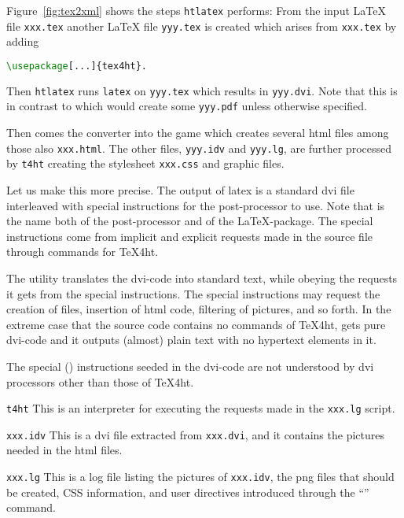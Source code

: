 Figure~\ref{fig:tex2xml} shows the steps \texttt{htlatex} performs: 
From the input \LaTeX{} file \texttt{xxx.tex} 
another \LaTeX{} file \texttt{yyy.tex} is created 
which arises from \texttt{xxx.tex} by adding 
\begin{lstlisting}[language=TeX]
\usepackage[...]{tex4ht}. 
\end{lstlisting}
%
Then \texttt{htlatex} runs \texttt{latex} on \texttt{yyy.tex} 
which results in \texttt{yyy.dvi}. 
Note that this is in contrast to \lualatex{} 
which would create some \texttt{yyy.pdf} unless otherwise specified. 

Then comes the converter  into the game 
which creates several html files among those also \texttt{xxx.html}. 
The other files, \texttt{yyy.idv} and \texttt{yyy.lg}, 
are further processed by \texttt{t4ht} 
creating the stylesheet \texttt{xxx.css} and graphic files. 
\medskip


Let us make this more precise. 
The output of latex is a standard \gls{dvi} file 
interleaved with special instructions 
for the post-processor  to use. 
Note that  is the name both of the post-processor 
and of the \LaTeX-package. 
The special instructions come from implicit and explicit requests 
made in the source file through commands for TeX4ht. 

The utility  translates the dvi-code into standard text, 
while obeying the requests it gets from the special instructions. 
The special instructions may request the creation of files, 
insertion of html code, filtering of pictures, and so forth. 
In the extreme case that the source code contains no commands of TeX4ht, 
 gets pure dvi-code and it outputs (almost) plain text 
with no hypertext elements in it.

The special () 
instructions seeded in the dvi-code 
are not understood by dvi processors other than those of TeX4ht.

\texttt{t4ht}
This is an interpreter 
for executing the requests made in the \texttt{xxx.lg} script.

\texttt{xxx.idv}
This is a dvi file extracted from \texttt{xxx.dvi}, 
and it contains the pictures needed in the html files.

\texttt{xxx.lg}
This is a log file listing the pictures of \texttt{xxx.idv}, 
the \gls{png} files that should be created, CSS information, 
and user directives introduced 
through the ``'' command.

